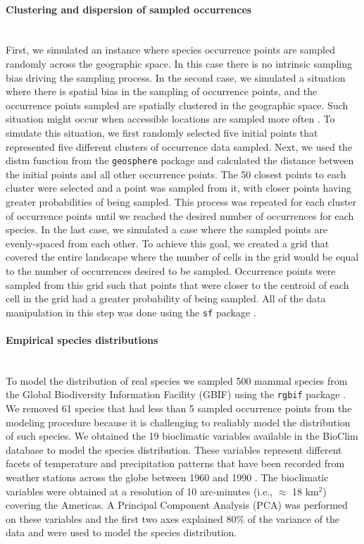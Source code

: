 \paragraph*{Clustering and dispersion of sampled occurrences}\mbox{}\\ 
First, we simulated an instance where species occurrence points are sampled randomly across the geographic space. In this case there is no intrinsic sampling bias driving the sampling process. In the second case, we simulated a situation where there is spatial bias in the sampling of occurrence points, and the occurrence points sampled are spatially clustered in the geographic space. Such situation might occur when accessible locations are sampled more often \parencite{botts2011, mair2016}. To simulate this situation, we first randomly selected five initial points that represented five different clusters of occurrence data sampled. Next, we used the distm function from the \texttt{geosphere} package \parencite{hijmans2019} and calculated the distance between the initial points and all other occurrence points. The 50 closest points to each cluster were selected and a point was sampled from it, with closer points having greater probabilities of being sampled. This process was repeated for each cluster of occurrence points until we reached the desired number of occurrences for each species. In the last case, we simulated a case where the sampled points are evenly-spaced from each other. To achieve this goal, we created a grid that covered the entire landscape where the number of cells in the grid would be equal to the number of occurrences desired to be sampled. Occurrence points were sampled from this grid such that points that were closer to the centroid of each cell in the grid had a greater probability of being sampled. All of the data manipulation in this step was done using the \texttt{sf} package \parencite{pabesma2018}. 


\paragraph*{Empirical species distributions}\mbox{}\\ 
To model the distribution of real species we sampled 500 mammal species from the Global Biodiversity Information Facility (GBIF) using the \texttt{rgbif} package \parencite{chamberlain2021}. We removed 61 species that had less than 5 sampled occurrence points from the modeling procedure because it is challenging to realiably model the distribution of such species. We obtained the 19 bioclimatic variables available in the BioClim database \parencite{hijmans2005} to model the species distribution. These variables represent different facets of temperature and precipitation patterns that have been recorded from weather stations across the globe between 1960 and 1990 \parencite{hijmans2005}. The bioclimatic variables were obtained at a resolution of 10 arc-minutes (i.e., $\approx$ 18 km$^2$) covering the Americas. A Principal Component Analysis (PCA) was performed on these variables and the first two axes explained 80\% of the variance of the data and were used to model the species distribution.


